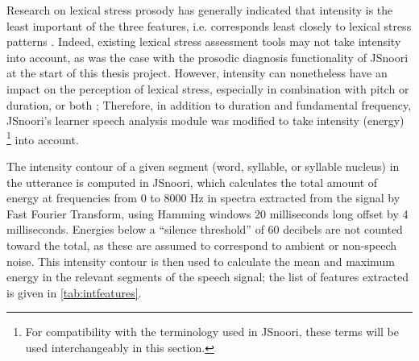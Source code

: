 		Research on lexical stress prosody has generally indicated that intensity is the least important of the three features, i.e. corresponds least closely to lexical stress patterns \citep{Cutler2005}. 
Indeed, existing lexical stress assessment tools may not take intensity into account, as 
was the case with the prosodic diagnosis functionality of JSnoori at the start of this thesis project.
However, intensity can nonetheless have an impact on the perception of lexical stress, especially in combination with pitch or duration, or both \citep{Cutler2005}; %
Therefore, in addition to duration and fundamental frequency,
 JSnoori's learner speech analysis module was modified to take intensity (energy)%
 \footnote{ For compatibility with the terminology used in JSnoori, these terms will be used interchangeably in this section.} 
 into account.




	The intensity contour of a given segment (word, syllable, or syllable nucleus) in the utterance is computed in JSnoori, which calculates the total amount of energy at frequencies from 0 to 8000 Hz in spectra extracted from the signal by Fast Fourier Transform, using Hamming windows 20 milliseconds long offset by 4 milliseconds.
	Energies below a ``silence threshold'' of 60 decibels are not counted toward the total, as these are assumed to correspond to ambient or non-speech noise.  
	This intensity contour is then used to calculate the mean and maximum energy in the relevant segments of the speech signal; the list of features extracted is given in \cref{tab:intfeatures}.
	
	
	
